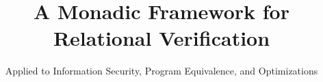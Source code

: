\documentclass[sigplan,screen]{acmart}\settopmatter{}
\begin{document}
\title{A Monadic Framework for Relational Verification}


\subtitle{Applied to Information Security, Program Equivalence, and Optimizations}




\xxx{}
\end{document}
